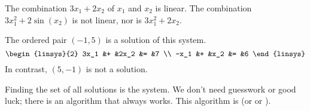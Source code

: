 \begin{example}
The combination \( 3x_1 + 2x_2 \) of $x_1$ and $x_2$ is linear.
The combination \( 3x_1^2 + 2\sin(x_2) \) is not linear, nor is
\( 3x_1^2 + 2x_2 \).  
\end{example}

\begin{example}
The ordered pair \( (-1,5) \) is a solution of this system.
\begin{equation*}
  \begin{linsys}{2}
    3x_1 &+ &2x_2 &= &7  \\
    -x_1 &+ &x_2  &= &6
  \end{linsys}
\end{equation*}
In contrast, \( (5,-1) \) is not a solution.
\end{example}

Finding the set of all solutions is 
the system.
We don't need 
guesswork or good luck; 
there is an algorithm that always works.
This algorithm is  
%
(or %
or %
%
%
).

